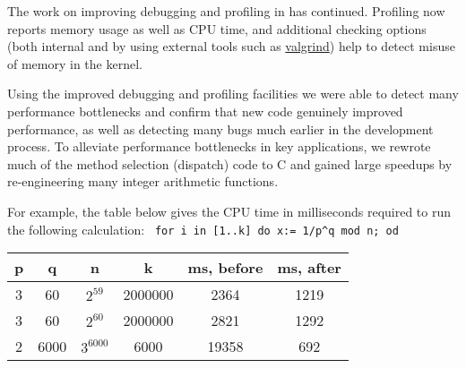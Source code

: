 The work on improving debugging and profiling in \GAP has
continued. Profiling now reports memory usage as well as CPU time, and
additional checking options (both internal and by using external tools such as
\href{???}{valgrind}) help to detect misuse of memory in the kernel.

Using the improved debugging and profiling facilities we were able to
detect many performance bottlenecks and confirm that new code
genuinely improved performance, as well as detecting many bugs much
earlier in the development process. To alleviate performance
bottlenecks in key applications, we rewrote much of the method
selection (dispatch) code \GAP to C and gained large speedups by
re-engineering many integer arithmetic functions.


For example, the table below gives the CPU time in milliseconds required
to run the following calculation: \, \verb|for i in [1..k] do x:= 1/p^q mod n; od|

\begin{center}
\begin{tabular}{| c | c | c | c | c | c |} 
\hline
p & q    & n          & k        & ms, before & ms, after \\
\hline
3 & 60   & $2^{59}$   & 2000000  & 2364       & 1219 \\
3 & 60   & $2^{60}$   & 2000000  & 2821       & 1292 \\
2 & 6000 & $3^{6000}$ & 6000     & 19358      & 692  \\
\hline
\end{tabular}
\end{center}

%
%

%
%


